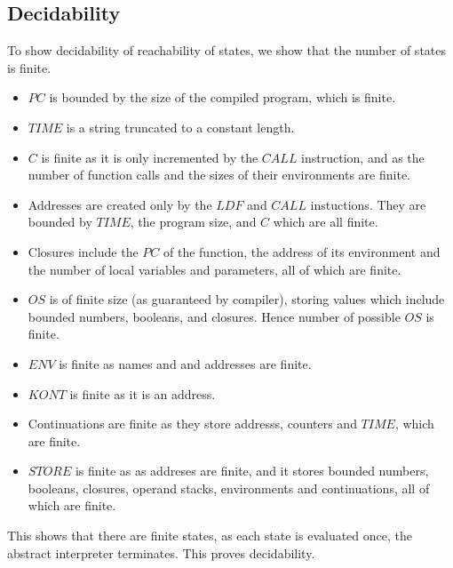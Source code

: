 \documentclass[12pt]{article}
\begin{document}
\subsection{Decidability}
To show decidability of reachability of states, we show that the number of states is finite. 
\begin{itemize}
  \item $PC$ is bounded by the size of the compiled program, which is finite.
        
  \item $TIME$ is a string truncated to a constant length.
        
  \item $C$ is finite as it is only incremented by the $CALL$ instruction, and as the number of function calls and the sizes of their environments are finite.
        
  \item Addresses are created only by the $LDF$ and $CALL$ instuctions. They are bounded by $TIME$, the program size, and $C$ which are all finite.
        
  \item Closures include the $PC$ of the function, the address of its environment and the number of local variables and parameters, all of which are finite.
        
  \item $OS$ is of finite size (as guaranteed by compiler), storing values which include bounded numbers, booleans, and closures. Hence number of possible $OS$ is finite.
        
  \item $ENV$ is finite as names and and addresses are finite.
        
  \item $KONT$ is finite as it is an address.
        
  \item Continuations are finite as they store addresss, counters and $TIME$, which are finite.
        
  \item $STORE$ is finite as as addreses are finite, and it stores bounded numbers, booleans, closures, operand stacks, environments and continuations, all of which are finite.
\end{itemize}

This shows that there are finite states, as each state is evaluated once, the abstract interpreter terminates. This proves decidability.
\end{document}
